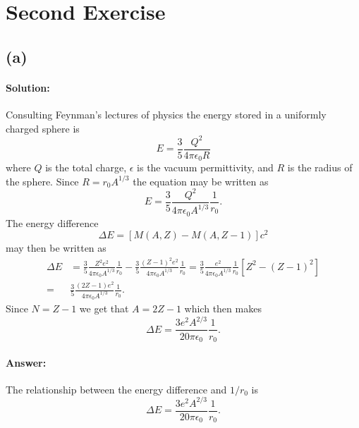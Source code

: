 \section{Second Exercise}
\subsection*{(a)}
\paragraph{Solution:} Consulting Feynman's lectures of physics the energy stored in a uniformly charged sphere is
\begin{equation}
    E = \frac{3}{5} \frac{Q^2}{4 \pi \epsilon_0 R}
\end{equation}
where $Q$ is the total charge, $\epsilon$ is the vacuum permittivity, and $R$ is the radius of the sphere. Since $R = r_0 A^{1/3}$ the equation may be written as
\begin{equation}
        E = \frac{3}{5} \frac{Q^2}{4 \pi \epsilon_0 A^{1/3}} \frac{1}{r_0}.
\end{equation}
The energy difference 
\begin{equation}
    \Delta E = [M(A, Z) - M(A, Z - 1)]c^2\label{eq:MassE}
\end{equation}
may then be written as 
\begin{align}
    \Delta E &= \frac{3}{5} \frac{Z^2 e^2}{4 \pi \epsilon_0 A^{1/3}} \frac{1}{r_0} - \frac{3}{5} \frac{(Z-1)^2 e^2}{4 \pi \epsilon_0 A^{1/3}} \frac{1}{r_0} = \frac{3}{5} \frac{e^2}{4\pi \epsilon_0 A^{1/3}} \frac{1}{r_0} [Z^2 - (Z-1)^2]\\
    =& \frac{3}{5} \frac{(2Z - 1) e^2}{4\pi\epsilon_0 A^{1/3}} \frac{1}{r_0}.
\end{align}
Since $N = Z-1$ we get that $A = 2Z - 1$ which then makes
\begin{equation}
    \Delta E = \frac{3 e^2 A^{2/3}}{20 \pi \epsilon_0} \frac{1}{r_0}.
\end{equation}

\paragraph{Answer:} The relationship between the energy difference and $1/r_0$ is 
\begin{equation}
    \Delta E = \frac{3 e^2 A^{2/3}}{20 \pi \epsilon_0} \frac{1}{r_0}.\label{eq:deltaE}
\end{equation}

